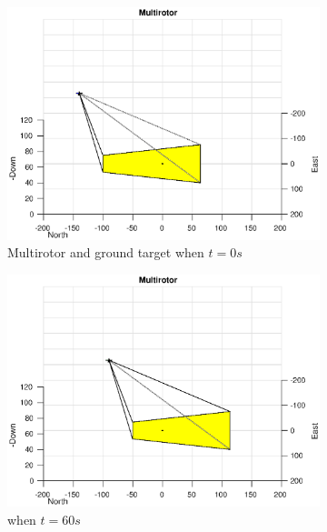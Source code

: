 \begin{figure}
	\centering
	\begin{subfigure}[b]{0.45\linewidth}
		\includegraphics[width=\textwidth]{images/chapter4/image_UAV_0mps}
		\caption{Multirotor and ground target when $t=0s$}
	\end{subfigure}
	\begin{subfigure}[b]{0.45\linewidth}
		\includegraphics[width=\textwidth]{images/chapter4/image_UAV_0mps_60s}
		\caption{when $t=60s$}
	\end{subfigure}
	\begin{subfigure}[b]{0.45\linewidth}

\end{subfigure}
\end{figure}
